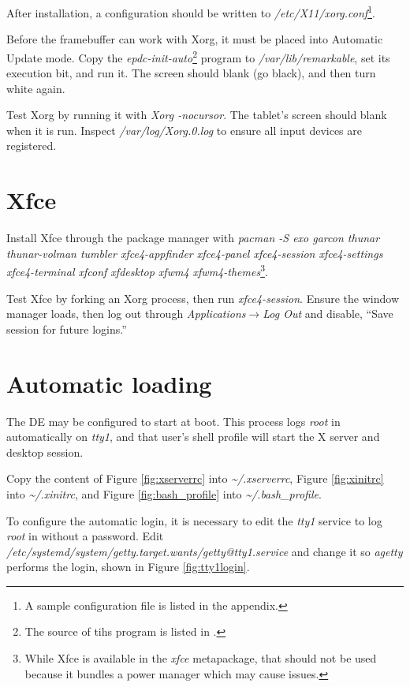 \documentclass{memoir}
\begin{document}
After installation, a configuration should be written to \textit{/etc/X11/xorg.conf}\footnote{A sample configuration file is listed in the  appendix.}.

Before the framebuffer can work with Xorg, it must be placed into Automatic Update mode. Copy the \textit{epdc-init-auto}\footnote{The source of tihs program is listed in .} program to \textit{/var/lib/remarkable}, set its execution bit, and run it. The screen should blank (go black), and then turn white again.

Test Xorg by running it with \textit{Xorg -nocursor}. The tablet's screen should blank when it is run. Inspect \textit{/var/log/Xorg.0.log} to ensure all input devices are registered.


\section{Xfce}
Install Xfce through the package manager with \textit{pacman -S exo garcon thunar thunar-volman tumbler xfce4-appfinder xfce4-panel xfce4-session xfce4-settings xfce4-terminal xfconf xfdesktop xfwm4 xfwm4-themes}\footnote{While Xfce is available in the \textit{xfce} metapackage, that should not be used because it bundles a power manager which may cause issues.}.

Test Xfce by forking an Xorg process, then run \textit{xfce4-session}. Ensure the window manager loads, then log out through \textit{Applications$\rightarrow$Log Out} and disable, ``Save session for future logins.''


\section{Automatic loading}
The DE may be configured to start at boot. This process logs \textit{root} in automatically on \textit{tty1}, and that user's shell profile will start the X server and desktop session.

Copy the content of Figure \ref{fig:xserverrc} into \textit{\textasciitilde/.xserverrc}, Figure \ref{fig:xinitrc} into \textit{\textasciitilde/.xinitrc}, and Figure \ref{fig:bash_profile} into \textit{\textasciitilde/.bash\_profile}.

To configure the automatic login, it is necessary to edit the \textit{tty1} service to log \textit{root} in without a password. Edit \textit{/etc/systemd/system/getty.target.wants/getty@tty1.service} and change it so \textit{agetty} performs the login, shown in Figure \ref{fig:tty1login}.
\end{document}
